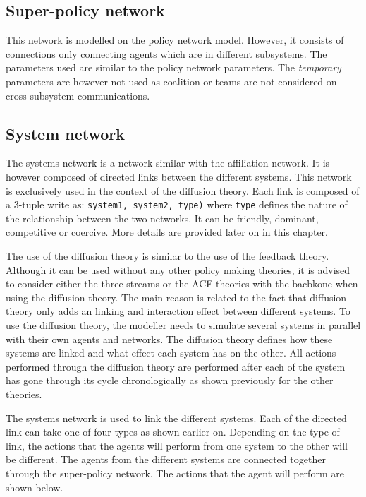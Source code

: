 \subsection{Super-policy network}


This network is modelled on the policy network model. However, it consists of connections only connecting agents which are in different subsystems. The parameters used are similar to the policy network parameters. The \emph{temporary} parameters are however not used as coalition or teams are not considered on cross-subsystem communications.






\subsection{System network}


The systems network is a network similar with the affiliation network. It is however composed of directed links between the different systems. This network is exclusively used in the context of the diffusion theory. Each link is composed of a 3-tuple write as: \texttt{system1, system2, type)} where \texttt{type} defines the nature of the relationship between the two networks. It can be friendly, dominant, competitive or coercive. More details are provided later on in this chapter.








The use of the diffusion theory is similar to the use of the feedback theory. Although it can be used without any other policy making theories, it is advised to consider either the three streams or the ACF theories with the bacbkone when using the diffusion theory. The main reason is related to the fact that diffusion theory only adds an linking and interaction effect between different systems. To use the diffusion theory, the modeller needs to simulate several systems in parallel with their own agents and networks. The diffusion theory defines how these systems are linked and what effect each system has on the other. All actions performed through the diffusion theory are performed after each of the system has gone through its cycle chronologically as shown previously for the other theories.


The systems network is used to link the different systems. Each of the directed link can take one of four types as shown earlier on. Depending on the type of link, the actions that the agents will perform from one system to the other will be different. The agents from the different systems are connected together through the super-policy network. The actions that the agent will perform are shown below.


